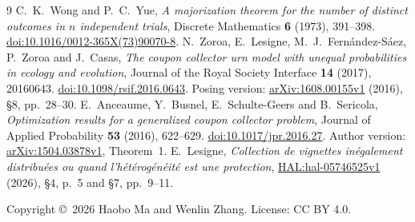 \documentclass[11pt,a4paper]{article}
\begin{document}
\begin{thebibliography}{9}
C.~K.~Wong and P.~C.~Yue,
\emph{A majorization theorem for the number of distinct outcomes in
$n$ independent trials}, Discrete Mathematics \textbf{6} (1973),
391--398.
\href{https://doi.org/10.1016/0012-365X(73)90070-8}{doi:10.1016/0012-365X(73)90070-8}.
N.~Zoroa, E.~Lesigne, M.~J.~Fern\'andez-S\'aez, P.~Zoroa and J.~Casas,
\emph{The coupon collector urn model with unequal probabilities in ecology
and evolution}, Journal of the Royal Society Interface \textbf{14} (2017),
20160643. \href{https://doi.org/10.1098/rsif.2016.0643}{doi:10.1098/rsif.2016.0643}.
Posing version: \href{https://arxiv.org/abs/1608.00155v1}{arXiv:1608.00155v1}
(2016), \S8, pp.~28--30.
E.~Anceaume, Y.~Busnel, E.~Schulte-Geers and B.~Sericola,
\emph{Optimization results for a generalized coupon collector problem},
Journal of Applied Probability \textbf{53} (2016), 622--629.
\href{https://doi.org/10.1017/jpr.2016.27}{doi:10.1017/jpr.2016.27}.
Author version: \href{https://arxiv.org/abs/1504.03878v1}{arXiv:1504.03878v1}, Theorem~1.
E.~Lesigne, \emph{Collection de vignettes in\'egalement distribu\'ees ou
quand l'h\'et\'erog\'en\'eit\'e est une protection},
\href{https://hal.science/hal-05746525v1}{HAL:hal-05746525v1} (2026),
\S4, p.~5 and \S7, pp.~9--11.
\end{thebibliography}
\noindent\footnotesize Copyright \copyright\ 2026 Haobo Ma and Wenlin Zhang. License: CC BY 4.0.
\end{document}
